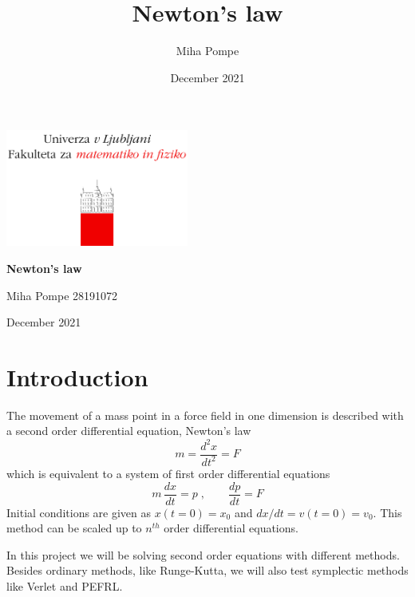\documentclass[12pt, a4paper]{article}
\title{Newton's law}
\author{Miha Pompe}
\date{December 2021}
\begin{document}
\begin{titlepage}
	\centering
 	\includegraphics[width=0.45\textwidth]{logo_fmf_uni-lj_sl_veliki.png}\par\vspace{1cm}

	\vspace{1cm}

	\vspace{1.5cm}
	{\huge\bfseries Newton's law\par}
	\vspace{2cm}
	{\Large Miha Pompe 28191072\par}
	\vfill

	\vfill

	{\large December 2021\par}
\end{titlepage}
\thispagestyle{empty}
\clearpage
{}
\newpage


\section{Introduction}

The movement of a mass point in a force field in one dimension is described with a second order differential equation, Newton's law
\begin{equation*}
  m = \frac{d^2x}{dt^2} = F
\end{equation*}
which is equivalent to a system of first order differential equations
\begin{equation*}
  m\, \frac{dx}{dt} = p \;, \qquad \frac{dp}{dt} = F
\end{equation*}
Initial conditions are given as $x(t=0)=x_0$ and $dx/dt=v(t=0)=v_0$. This method can be scaled up to $n^{th}$ order differential equations.

In this project we will be solving second order equations with different methods. Besides ordinary methods, like Runge-Kutta, we will also test symplectic methods like Verlet and PEFRL.
\end{document}

